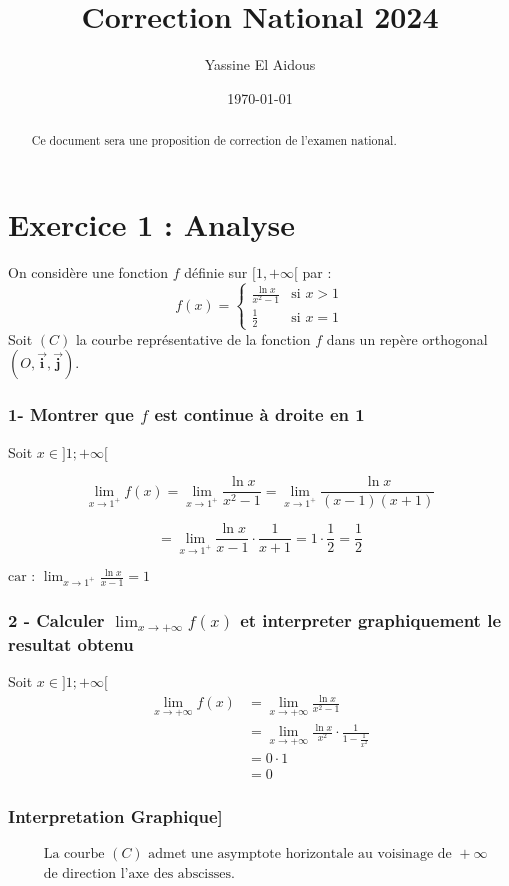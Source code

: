 \documentclass{article}
\title{Correction National 2024}
\author{Yassine El Aidous}
\date{\today} %
\begin{document}
\maketitle %

\begin{abstract}
    Ce document sera une proposition de correction de l'examen national.
\end{abstract}

\tableofcontents %

\newpage

\section{Exercice 1 : Analyse}

On considère une fonction \( f \) définie sur \( [1, +\infty[ \) par :
\[
f(x) = 
\begin{cases}
    \frac{\ln x}{x^2 - 1} & \text{si } x > 1 \\
    \frac{1}{2} & \text{si } x = 1
\end{cases}
\]
Soit \( (C) \) la courbe représentative de la fonction \( f \) dans un repère orthogonal \( (O, \vec{\mathbf{i}}, \vec{\mathbf{j}}) \).

\subsubsection*{1- Montrer que \( f \) est continue à droite en 1}

Soit \( x \in ]1; +\infty[ \) %

\[
\lim_{x \to 1^+} f(x) = \lim_{x \to 1^+} \frac{\ln x}{x^2 - 1} = \lim_{x \to 1^+} \frac{\ln x}{(x-1)(x+1)}
\]

\[
= \lim_{x \to 1^+} \frac{\ln x}{x-1} \cdot \frac{1}{x+1} = 1 \cdot \frac{1}{2} = \frac{1}{2}
\]

\( \text{car : } \lim_{x \to 1^+} \frac{\ln x}{x-1} = 1 \)

\subsubsection*{2 - Calculer \( \lim_{x \to +\infty} f(x) \) et interpreter graphiquement le resultat obtenu}
    Soit \( x \in ]1;+\infty[ \)
    \begin{align*}
        \lim_{x \to +\infty} f(x) &= \lim_{x \to +\infty} \frac{\ln x}{x^2 - 1} \\
        &= \lim_{x \to +\infty} \frac{\ln x}{x^2} \cdot \frac{1}{1 - \frac{1}{x^2}} \\
        &= 0 \cdot 1 \\
        &= 0
    \end{align*}

    \subsubsection*{Interpretation Graphique]}
    \begin{align*}
        & \text{La courbe } (C) \text{ admet une asymptote horizontale au voisinage de } +\infty \\
        & \text{de direction l'axe des abscisses.}
    \end{align*}
    
\end{document}

